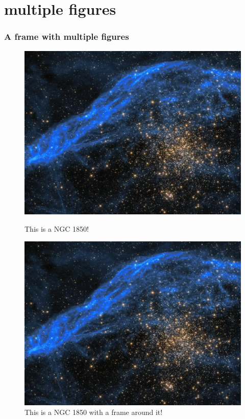\documentclass{beamer}
\begin{document}
\section{multiple figures}
\begin{frame}
  \frametitle{A frame with multiple figures}
  
  \begin{figure}
    \centering
  \begin{minipage}[t]{0.5\textwidth}
    \includegraphics[scale=0.3]{bgtitlepage.jpg}
    \caption{This is a NGC 1850!}
  \end{minipage}
  \hfill
  \begin{minipage}[t]{0.45\textwidth}
    \includegraphics[scale=0.3,cframe=accentcolour 0.5pt,center]{bgtitlepage.jpg}
    \caption{This is a NGC 1850 with a frame around it!}
  \end{minipage}
\end{figure}
\end{frame}
\end{document}
